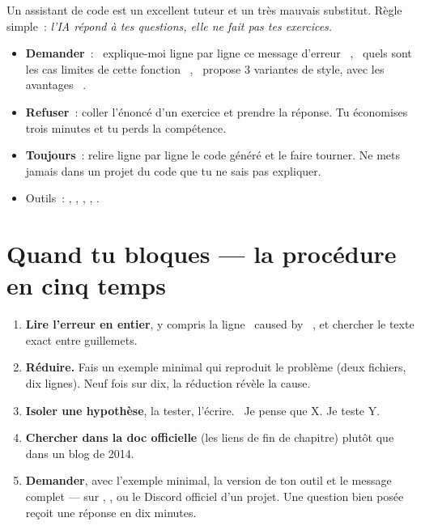 Un assistant de code est un excellent tuteur et un tr\`es mauvais substitut. R\`egle simple~:
\emph{l'IA r\'epond \`a tes questions, elle ne fait pas tes exercices.}

\begin{itemize}
  \item \textbf{Demander}~: \og ~explique-moi ligne par ligne ce message d'erreur~ \fg{}, \og ~quels sont les
        cas limites de cette fonction~ \fg{}, \og ~propose 3 variantes de style, avec les avantages~ \fg{}.
  \item \textbf{Refuser}~: coller l'\'enonc\'e d'un exercice et prendre la r\'eponse. Tu \'economises
        trois minutes et tu perds la comp\'etence.
  \item \textbf{Toujours}~: relire ligne par ligne le code g\'en\'er\'e et le faire tourner. Ne
        mets jamais dans un projet du code que tu ne sais pas expliquer.
  \item Outils~: ,
        , ,
        , .
\end{itemize}

\section{Quand tu bloques --- la proc\'edure en cinq temps}

\begin{enumerate}
  \item \textbf{Lire l'erreur en entier}, y compris la ligne \og ~caused by~ \fg{}, et chercher
        le texte exact entre guillemets.
  \item \textbf{R\'eduire.} Fais un exemple minimal qui reproduit le probl\`eme (deux fichiers,
        dix lignes). Neuf fois sur dix, la r\'eduction r\'ev\`ele la cause.
  \item \textbf{Isoler une hypoth\`ese}, la tester, l'\'ecrire. \og ~Je pense que X. Je teste Y.~ \fg{}
  \item \textbf{Chercher dans la doc officielle} (les liens de fin de chapitre) plut\^ot que
        dans un blog de 2014.
  \item \textbf{Demander}, avec l'exemple minimal, la version de ton outil et le message complet
        --- sur ,
        ,
         ou le Discord officiel
        d'un projet. Une question bien pos\'ee re\c{c}oit une r\'eponse en dix minutes.
\end{enumerate}

